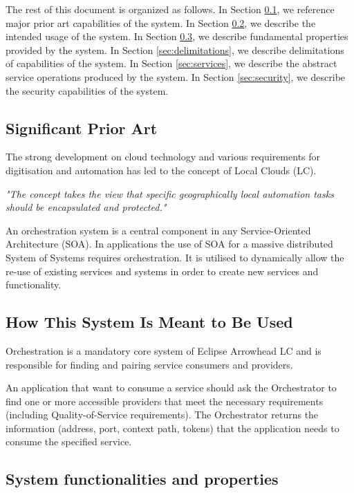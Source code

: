 \documentclass[a4paper]{arrowhead}
\begin{document}
The rest of this document is organized as follows.
In Section \ref{sec:prior_art}, we reference major prior art capabilities
of the system.
In Section \ref{sec:use}, we describe the intended usage of the system.
In Section \ref{sec:properties}, we describe fundamental properties
provided by the system.
In Section \ref{sec:delimitations}, we describe delimitations of capabilities
of the system.
In Section \ref{sec:services}, we describe the abstract service
operations produced by the system.
In Section \ref{sec:security}, we describe the security capabilities
of the system.

\subsection{Significant Prior Art}
\label{sec:prior_art}

The strong development on cloud technology and various requirements for digitisation and automation has led to the concept of Local Clouds (LC).

\textit{"The concept takes the view that specific geographically local automation tasks should be encapsulated and protected."} \cite{jerker2017localclouds}

An orchestration system is a central component in any Service-Oriented Architecture (SOA). In applications the use of SOA for a massive distributed System of Systems requires orchestration. It is utilised to dynamically allow the re-use of existing services and systems in order to create new services and functionality. 

\subsection{How This System Is Meant to Be Used}
\label{sec:use}

Orchestration is a mandatory core system of Eclipse Arrowhead LC and is responsible for finding and pairing service consumers and providers. 

An application that want to consume a service should ask the Orchestrator to find one or more accessible providers that meet the necessary requirements (including Quality-of-Service requirements). The Orchestrator returns the information (address, port, context path, tokens) that the application needs to consume the specified service.

\subsection{System functionalities and properties}
\label{sec:properties}
\end{document}
